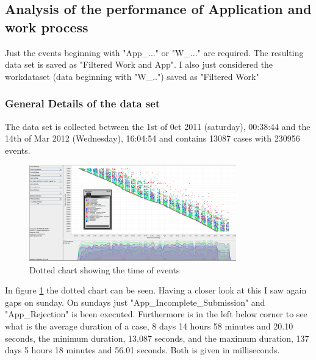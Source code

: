 \subsection{Analysis of the performance of Application and work process}

Just the events beginning with "App\_..." or "W\_..." are required. The resulting data set is saved as "Filtered Work and App". I also just considered the workdataset (data beginning with "W\_..") saved as "Filtered Work"

\subsubsection{General Details of the data set}
The data set is collected between the 1st of 0ct 2011 (saturday), 00:38:44 and the 14th of Mar 2012 (Wednesday), 16:04:54 and contains 13087 cases with 230956 events. 

\begin{figure}[!htbp]
\centering
\includegraphics[width = 0.8\textwidth]{AppWorkDot.PNG}
\caption{Dotted chart showing the time of events}
\label{fig:AppWorkTimeFlow}
\end{figure}

In figure \ref{fig:AppWorkTimeFlow} the dotted chart can be seen. Having a closer look at this I saw again gaps on sunday. On sundays just "App\_Incomplete\_Submission" and "App\_Rejection" is been executed. Furthermore is in the left below corner to see what is the average duration of a case, 8 days 14 hours 58 minutes and 20.10 seconds, the minimum duration, 13.087 seconds, and the maximum duration, 137 days 5 hours 18 minutes and 56.01 seconds. Both is given in milliseconds.

